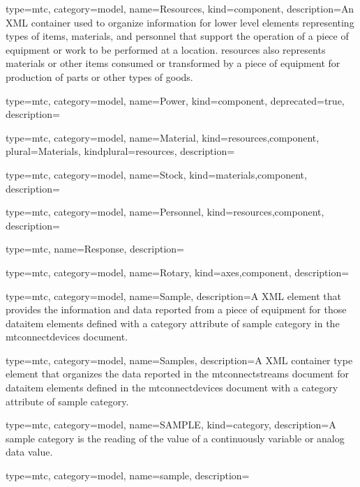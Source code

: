 {
  type=mtc,
  category=model,
  name={Resources},
  kind={component},
  description={An XML container used to organize information for \gls{lower level} elements representing types of items, materials, and personnel that support the operation of a piece of equipment or work to be performed at a location. \gls{resources} also represents materials or other items consumed or transformed by a piece of equipment for production of parts or other types of goods.}
}


{
  type=mtc,
  category=model,
  name={Power},
  kind={component},
  deprecated={true},
  description={}
}


{
  type=mtc,
  category=model,
  name={Material},
  kind={resources,component},
  plural={Materials},
  kindplural={resources},
  description={}
}


{
  type=mtc,
  category=model,
  name={Stock},
  kind={materials,component},
  description={}
}


{
  type=mtc,
  category=model,
  name={Personnel},
  kind={resources,component},
  description={}
}


{
  type=mtc,
  name={Response},
  description={}
}



{
  type=mtc,
  category=model,
  name={Rotary},
  kind={axes,component},
  description={}
}


{
  type=mtc,
  category=model,
  name={Sample},
  description={A XML element that provides the information and data reported from a piece of equipment for those \gls{dataitem} elements defined with a \gls{category} attribute of \gls{sample category} in the \glspl{mtconnectdevice} document. }
}


{
  type=mtc,
  category=model,
  name={Samples},
  description={A XML container type element that organizes the data reported in the \glspl{mtconnectstream} document for \gls{dataitem} elements defined in the \glspl{mtconnectdevice} document with a \gls{category} attribute of \gls{sample category}.}
}


{
  type=mtc,
  category=model,
  name={SAMPLE},
  kind={category},
  description={A \gls{sample category} is the reading of the value of a continuously variable or analog data value.}
}


{
  type=mtc,
  category=model,
  name={sample},
  description={}
}


